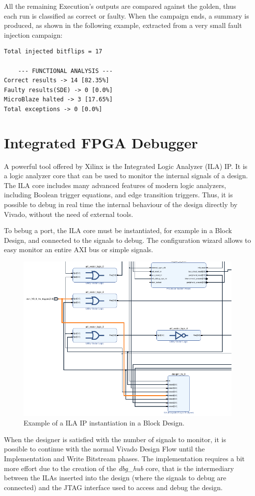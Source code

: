 All the remaining Execution's outputs are compared against the golden, thus each run is classified as correct or faulty. When the campaign ends, a summary is produced, as shown in the following example, extracted from a very small fault injection campaign:\bigskip

\begin{lstlisting}[style=preformatted]
Total injected bitflips = 17

    --- FUNCTIONAL ANALYSIS ---
Correct results -> 14 [82.35%]
Faulty results(SDE) -> 0 [0.0%]
MicroBlaze halted -> 3 [17.65%]
Total exceptions -> 0 [0.0%]
\end{lstlisting}

\section{Integrated FPGA Debugger}
\label{sec:ila}

A powerful tool offered by Xilinx is the Integrated Logic Analyzer (ILA) IP. It is a logic analyzer core that can be used to monitor the internal signals of a design. The ILA core includes many advanced features of modern logic analyzers, including Boolean trigger equations, and edge transition triggers. Thus, it is possible to debug in real time the internal behaviour of the design directly by Vivado, without the need of external tools.\bigskip

To bebug a port, the ILA core must be instantiated, for example in a Block Design, and connected to the signals to debug. The configuration wizard allows to easy monitor an entire AXI bus or simple signals. 

\begin{figure}[H]
\centering
\includegraphics[width=0.55\linewidth]{images/chapter3/ila_inst_example_cropped_again.pdf}
\caption{Example of a ILA IP instantiation in a Block Design.}
\end{figure}

When the designer is satisfied with the number of signals to monitor, it is possible to continue with the normal Vivado Design Flow until the Implementation and Write Bitstream phases. The implementation requires a bit more effort due to the creation of the \textit{dbg_hub} core, that is the intermediary between the ILAs inserted into the design (where the signals to debug are connected) and the JTAG interface used to access and debug the design.\bigskip

